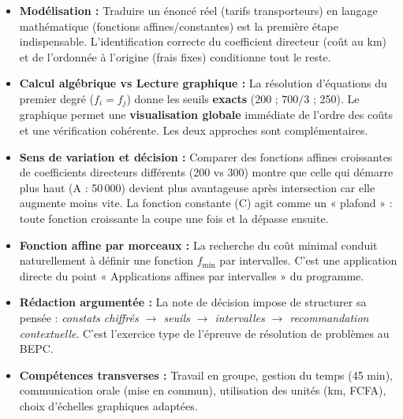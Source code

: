 \documentclass[11pt]{article}
\begin{document}
\begin{itemize}
    \item \textbf{Modélisation :} Traduire un énoncé réel (tarifs transporteurs) en langage mathématique (fonctions affines/constantes) est la première étape indispensable. L'identification correcte du coefficient directeur (coût au km) et de l'ordonnée à l'origine (frais fixes) conditionne tout le reste.
    \item \textbf{Calcul algébrique vs Lecture graphique :} La résolution d'équations du premier degré ($f_i = f_j$) donne les seuils \textbf{exacts} (200 ; $700/3$ ; 250). Le graphique permet une \textbf{visualisation globale} immédiate de l'ordre des coûts et une vérification cohérente. Les deux approches sont complémentaires.
    \item \textbf{Sens de variation et décision :} Comparer des fonctions affines croissantes de coefficients directeurs différents (200 vs 300) montre que celle qui démarre plus haut (A : 50\,000) devient plus avantageuse après intersection car elle augmente moins vite. La fonction constante (C) agit comme un « plafond » : toute fonction croissante la coupe une fois et la dépasse ensuite.
    \item \textbf{Fonction affine par morceaux :} La recherche du coût minimal conduit naturellement à définir une fonction $f_{\min}$ par intervalles. C'est une application directe du point « Applications affines par intervalles » du programme.
    \item \textbf{Rédaction argumentée :} La note de décision impose de structurer sa pensée : \emph{constats chiffrés $\rightarrow$ seuils $\rightarrow$ intervalles $\rightarrow$ recommandation contextuelle}. C'est l'exercice type de l'épreuve de résolution de problèmes au BEPC.
    \item \textbf{Compétences transverses :} Travail en groupe, gestion du temps (45 min), communication orale (mise en commun), utilisation des unités (km, FCFA), choix d'échelles graphiques adaptées.
\end{itemize}
\end{document}
